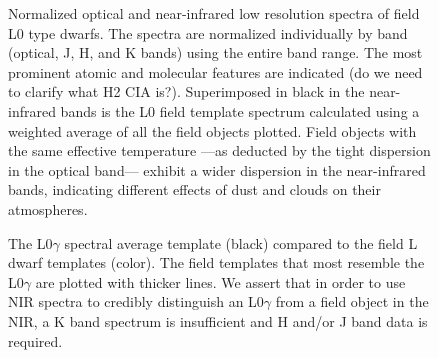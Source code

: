 \documentclass[12pt,preprint]{aastex}
\begin{document}
\begin{landscape}

\begin{figure}
	\caption{Normalized optical and near-infrared low resolution spectra of field L0 type
dwarfs. The spectra are normalized individually by band (optical, J, H, and K bands)
using the entire band range. The most prominent atomic and molecular features are indicated
(do we need to clarify what H2 CIA is?). Superimposed in black in the near-infrared
bands is the L0 field template spectrum calculated using a weighted average of all the
field objects plotted. Field objects with the same effective temperature —as deducted by
the tight dispersion in the optical band— exhibit a wider dispersion in the
near-infrared bands, indicating different effects of dust and clouds on their
atmospheres.}
\label{fig:L0young}
\end{figure}
\clearpage


\begin{figure}
	\caption{}
	\label{fig:L1young}
\end{figure}


\begin{figure}
	\caption{}
	\label{fig:L2young}
\end{figure}

\begin{figure}
	\caption{}
	\label{fig:L3young}
\end{figure}

\begin{figure}
	\caption{}
	\label{fig:L4young}
\end{figure}


\end{landscape}

\begin{figure}
	\caption{The L0$\gamma$ spectral average template (black) compared to the field L dwarf templates (color). The field templates that most resemble the L0$\gamma$ are plotted with thicker lines. We assert that in order to use NIR spectra to credibly distinguish an L0$\gamma$ from a field object in the NIR, a K band spectrum is insufficient and H and/or J band data is required.}
	\label{fig:L0g-field}
\end{figure}
\end{document}
